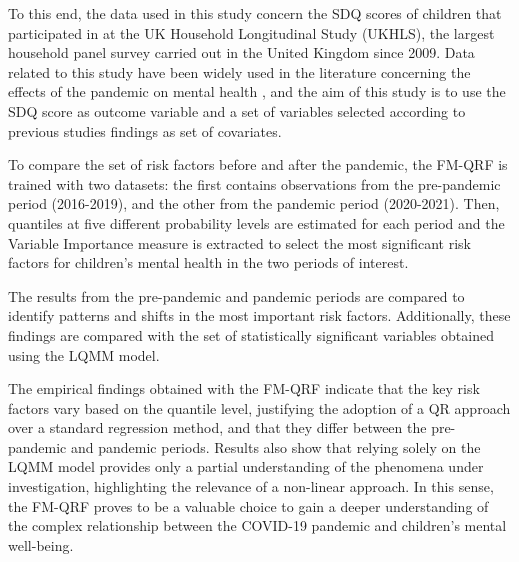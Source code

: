 \vspace{0.15in}

\noindent To this end, the data used in this study concern the SDQ scores of children that participated in at the UK Household Longitudinal Study (UKHLS), the largest household panel survey carried out in the United Kingdom since 2009. Data related to this study have been widely used in the literature concerning the effects of the pandemic on mental health \citep{miall2023inequalities,bayrakdar2023inequalities,metherell2022digital,daly2022psychological,thorn2022education,reimers2022primary,mendolia2022have}, and the aim of this study is to use the SDQ score as outcome variable and a set of variables selected according to previous studies findings as set of covariates.

\vspace{0.15in}

\noindent To compare the set of risk factors before and after the pandemic, the FM-QRF is trained with two datasets: the first contains observations from the pre-pandemic period (2016-2019), and the other from the pandemic period (2020-2021). Then, quantiles at five different probability levels are estimated for each period and the Variable Importance measure is extracted to select the most significant risk factors for children's mental health in the two periods of interest.

\vspace{0.15in}

\noindent The results from the pre-pandemic and pandemic periods are compared to identify patterns and shifts in the most important risk factors. Additionally, these findings are compared with the set of statistically significant variables obtained using the LQMM model.

\vspace{0.15in}

\noindent The empirical findings obtained with the FM-QRF indicate that the key risk factors vary based on the quantile level, justifying the adoption of a QR approach over a standard regression method, and that they differ between the pre-pandemic and pandemic periods. Results also show that relying solely on the LQMM model provides only a partial understanding of the phenomena under investigation, highlighting the relevance of a non-linear approach. In this sense, the FM-QRF proves to be a valuable choice to gain a deeper understanding of the complex relationship between the COVID-19 pandemic and children's mental well-being.

